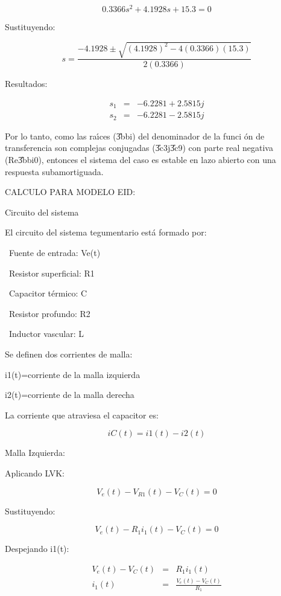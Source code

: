 \documentclass{article}
\begin{document}
\[
0.3366s^{2}+4.1928s+15.3=0
\]

Sustituyendo: 

\[
s=\frac{-4.1928\pm \sqrt{(4.1928)^{2}-4(0.3366)(15.3)}}{2(0.3366)}
\]

Resultados:

\begin{eqnarray*}
s_{1} &=&-6.2281+2.5815j \\
s_{2} &=&-6.2281-2.5815j
\end{eqnarray*}

Por lo tanto, como las ra\'{\i}ces (\U{3bb}i) del denominador de la funci%
\'{o}n de transferencia son complejas conjugadas (\U{3c3}\pm j\U{3c9}) con
parte real negativa (Re\U{3bb}i\TEXTsymbol{<}0), entonces el sistema del
caso es estable en lazo abierto con una respuesta subamortiguada. 

\bigskip 

CALCULO PARA MODELO EID:

Circuito del sistema 

El circuito del sistema tegumentario est\'{a} formado por: 

\textbullet\ Fuente de entrada: Ve(t) 

\textbullet\ Resistor superficial: R1 

\textbullet\ Capacitor t\'{e}rmico: C 

\textbullet\ Resistor profundo: R2 

\textbullet\ Inductor vascular: L

\bigskip 

Se definen dos corrientes de malla: 

i1(t)=corriente de la malla izquierda 

i2(t)=corriente de la malla derecha

\bigskip 

La corriente que atraviesa el capacitor es:

\[
iC(t)=i1(t)-i2(t)
\]

Malla Izquierda: 

Aplicando LVK: 

\[
V_{e}(t)-V_{R1}(t)-V_{C}(t)=0
\]

Sustituyendo:

\[
V_{e}(t)-R_{1}i_{1}(t)-V_{C}(t)=0
\]

Despejando i1(t):

\begin{eqnarray*}
V_{e}(t)-V_{C}(t) &=&R_{1}i_{1}(t) \\
i_{1}(t) &=&\frac{V_{e}(t)-V_{C}(t)}{R_{1}}
\end{eqnarray*}
\end{document}
